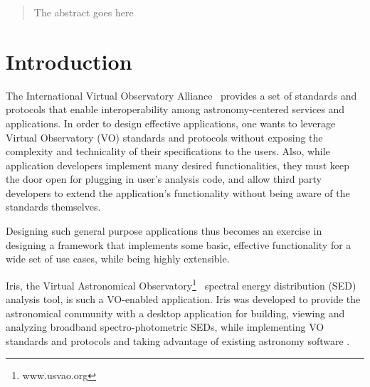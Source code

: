 \documentclass[preprint,12pt,3p]{elsarticle}
\begin{document}
\begin{frontmatter}
\address[sao]{Smithsonian Astrophysical Observatory, 60 Garden St.
Cambridge, MA 02138}
\address[stsci]{Space Telescope Science Institute, 3700 San Martin Dr.
Baltimore, MD 21218}
\address[ipac]{Infrared Processing and Analysis Center, 770 South Wilson Ave.
Pasadena, CA 91125}
\address[noao]{National Optical Astronomy Observatory, 950 N Cherry Ave.
Tucson, AZ 85719}



\begin{abstract}
The abstract goes here

\end{abstract}







\end{frontmatter}




\label{sec:introduction}
\section{Introduction} 
The International Virtual Observatory Alliance~\citep{2004SPIE.5493..137Q} provides a set of standards and protocols that enable interoperability among astronomy-centered services and applications.
In order to design effective applications, one wants to leverage Virtual Observatory (VO) standards and protocols without exposing the complexity and technicality of their specifications to the users. Also, while application developers implement many desired functionalities, they must keep the door open for plugging in user's analysis code, and allow third party developers to extend the application's functionality without being aware of the standards themselves.

Designing such general purpose applications thus becomes an exercise in designing a framework that implements some basic, effective functionality for a wide set of use cases, while being highly extensible.

Iris, the Virtual Astronomical Observatory\footnote{www.usvao.org}~\citep{2012SPIE.8449E..0HB} spectral energy distribution (SED) analysis tool, is such a VO-enabled application. Iris was developed to provide the astronomical community with a desktop application for building, viewing and analyzing broadband spectro-photometric SEDs, while implementing VO standards and protocols and taking advantage of existing astronomy software \citep{2012ASPC..461..893D,2013AAS...22124038L}.
\end{document}
